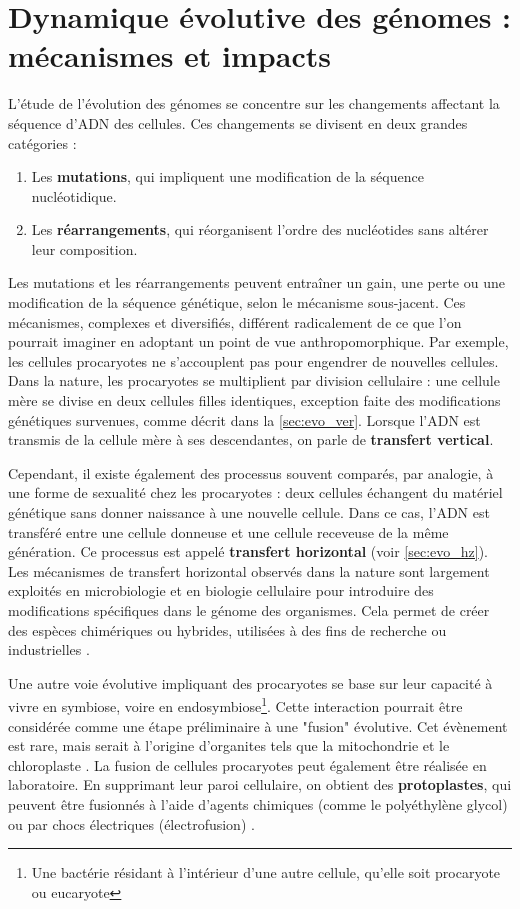 \section{Dynamique évolutive des génomes : mécanismes et impacts}
\label{sec:dyn_evo}

L'étude de l'évolution des génomes se concentre sur les changements affectant la séquence d'ADN des cellules. Ces changements se divisent en deux grandes catégories :  
\begin{enumerate}
    \item Les \textbf{mutations}, qui impliquent une modification de la séquence nucléotidique.  
    \item Les \textbf{réarrangements}, qui réorganisent l'ordre des nucléotides sans altérer leur composition.  
\end{enumerate}

Les mutations et les réarrangements peuvent entraîner un gain, une perte ou une modification de la séquence génétique, selon le mécanisme sous-jacent. Ces mécanismes, complexes et diversifiés, différent radicalement de ce que l'on pourrait imaginer en adoptant un point de vue anthropomorphique. Par exemple, les cellules procaryotes ne s'accouplent pas pour engendrer de nouvelles cellules. Dans la nature, les procaryotes se multiplient par division cellulaire : une cellule mère se divise en deux cellules filles identiques, exception faite des modifications génétiques survenues, comme décrit dans la \autoref{sec:evo_ver}. Lorsque l'ADN est transmis de la cellule mère à ses descendantes, on parle de \textbf{transfert vertical}.  

Cependant, il existe également des processus souvent comparés, par analogie, à une forme de sexualité chez les procaryotes : deux cellules échangent du matériel génétique sans donner naissance à une nouvelle cellule. Dans ce cas, l'ADN est transféré entre une cellule donneuse et une cellule receveuse de la même génération. Ce processus est appelé \textbf{transfert horizontal} (voir \autoref{sec:evo_hz}). Les mécanismes de transfert horizontal observés dans la nature sont largement exploités en microbiologie et en biologie cellulaire pour introduire des modifications spécifiques dans le génome des organismes. Cela permet de créer des espèces chimériques ou hybrides, utilisées à des fins de recherche ou industrielles \cite{baby_chromosomes_2019}. 

Une autre voie évolutive impliquant des procaryotes se base sur leur capacité à vivre en symbiose, voire en endosymbiose\footnote{Une bactérie résidant à l'intérieur d'une autre cellule, qu'elle soit procaryote ou eucaryote}. Cette interaction pourrait être considérée comme une étape préliminaire à une "fusion" évolutive. Cet évènement est rare, mais serait à l'origine d'organites tels que la mitochondrie et le chloroplaste \cite{martin_endosymbiotic_2015}. La fusion de cellules procaryotes peut également être réalisée en laboratoire. En supprimant leur paroi cellulaire, on obtient des \textbf{protoplastes}, qui peuvent être fusionnés à l'aide d'agents chimiques (comme le polyéthylène glycol) ou par chocs électriques (électrofusion) \cite{schaeffer_fusion_1976}.

